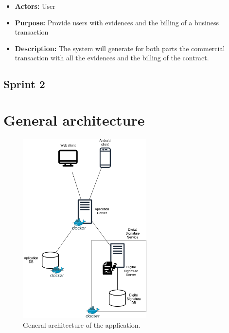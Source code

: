 \documentclass[./main.tex]{subfiles}
\begin{document}
\begin{itemize}
  \begin{itemize}
  
  \item
    \textbf{Actors:} User
  \item
    \textbf{Purpose:} Provide users with evidences and the billing of a
    business transaction
  \item
    \textbf{Description:} The system will generate for both parts the
    commercial transaction with all the evidences and the billing of
    the contract.
  \end{itemize}
\end{itemize}

\subsection{Sprint 2}

\hypertarget{general-architecture}{%
\section{General architecture}\label{general-architecture}}

\begin{figure}[H]
\centering
\includegraphics[width=0.6\textwidth]{architecture_diagram/Architecture.drawio.png}
\caption{General architecture of the application.}
\end{figure}


\end{document}
